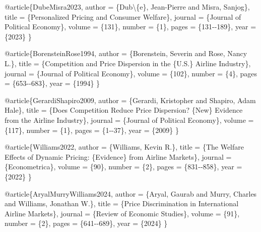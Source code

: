 \documentclass[
]{article}
\newenvironment{Shaded}{\begin{snugshade}}{\end{snugshade}}
\newcommand{\CharTok}[1]{\textcolor[rgb]{0.31,0.60,0.02}{#1}}
\newcommand{\DataTypeTok}[1]{\textcolor[rgb]{0.13,0.29,0.53}{#1}}
\newcommand{\NormalTok}[1]{#1}
\newcommand{\OtherTok}[1]{\textcolor[rgb]{0.56,0.35,0.01}{#1}}
\newcommand{\VariableTok}[1]{\textcolor[rgb]{0.00,0.00,0.00}{#1}}
\begin{document}
\begin{Shaded}
\begin{Highlighting}[]
\VariableTok{@article}\NormalTok{\{}\OtherTok{DubeMisra2023}\NormalTok{,}
  \DataTypeTok{author}\NormalTok{  = \{Dub}\CharTok{\textbackslash{}\textquotesingle{}}\NormalTok{\{e\}, Jean{-}Pierre and Misra, Sanjog\},}
  \DataTypeTok{title}\NormalTok{   = \{Personalized Pricing and Consumer Welfare\},}
  \DataTypeTok{journal}\NormalTok{ = \{Journal of Political Economy\},}
  \DataTypeTok{volume}\NormalTok{  = \{131\},}
  \DataTypeTok{number}\NormalTok{  = \{1\},}
  \DataTypeTok{pages}\NormalTok{   = \{131{-}{-}189\},}
  \DataTypeTok{year}\NormalTok{    = \{2023\}}
\NormalTok{\}}

\VariableTok{@article}\NormalTok{\{}\OtherTok{BorensteinRose1994}\NormalTok{,}
  \DataTypeTok{author}\NormalTok{  = \{Borenstein, Severin and Rose, Nancy L.\},}
  \DataTypeTok{title}\NormalTok{   = \{Competition and Price Dispersion in the \{U.S.\} Airline Industry\},}
  \DataTypeTok{journal}\NormalTok{ = \{Journal of Political Economy\},}
  \DataTypeTok{volume}\NormalTok{  = \{102\},}
  \DataTypeTok{number}\NormalTok{  = \{4\},}
  \DataTypeTok{pages}\NormalTok{   = \{653{-}{-}683\},}
  \DataTypeTok{year}\NormalTok{    = \{1994\}}
\NormalTok{\}}

\VariableTok{@article}\NormalTok{\{}\OtherTok{GerardiShapiro2009}\NormalTok{,}
  \DataTypeTok{author}\NormalTok{  = \{Gerardi, Kristopher and Shapiro, Adam Hale\},}
  \DataTypeTok{title}\NormalTok{   = \{Does Competition Reduce Price Dispersion? \{New\} Evidence from the Airline Industry\},}
  \DataTypeTok{journal}\NormalTok{ = \{Journal of Political Economy\},}
  \DataTypeTok{volume}\NormalTok{  = \{117\},}
  \DataTypeTok{number}\NormalTok{  = \{1\},}
  \DataTypeTok{pages}\NormalTok{   = \{1{-}{-}37\},}
  \DataTypeTok{year}\NormalTok{    = \{2009\}}
\NormalTok{\}}

\VariableTok{@article}\NormalTok{\{}\OtherTok{Williams2022}\NormalTok{,}
  \DataTypeTok{author}\NormalTok{  = \{Williams, Kevin R.\},}
  \DataTypeTok{title}\NormalTok{   = \{The Welfare Effects of Dynamic Pricing: \{Evidence\} from Airline Markets\},}
  \DataTypeTok{journal}\NormalTok{ = \{Econometrica\},}
  \DataTypeTok{volume}\NormalTok{  = \{90\},}
  \DataTypeTok{number}\NormalTok{  = \{2\},}
  \DataTypeTok{pages}\NormalTok{   = \{831{-}{-}858\},}
  \DataTypeTok{year}\NormalTok{    = \{2022\}}
\NormalTok{\}}

\VariableTok{@article}\NormalTok{\{}\OtherTok{AryalMurryWilliams2024}\NormalTok{,}
  \DataTypeTok{author}\NormalTok{  = \{Aryal, Gaurab and Murry, Charles and Williams, Jonathan W.\},}
  \DataTypeTok{title}\NormalTok{   = \{Price Discrimination in International Airline Markets\},}
  \DataTypeTok{journal}\NormalTok{ = \{Review of Economic Studies\},}
  \DataTypeTok{volume}\NormalTok{  = \{91\},}
  \DataTypeTok{number}\NormalTok{  = \{2\},}
  \DataTypeTok{pages}\NormalTok{   = \{641{-}{-}689\},}
  \DataTypeTok{year}\NormalTok{    = \{2024\}}
\NormalTok{\}}


\end{Highlighting}
\end{Shaded}
\end{document}
